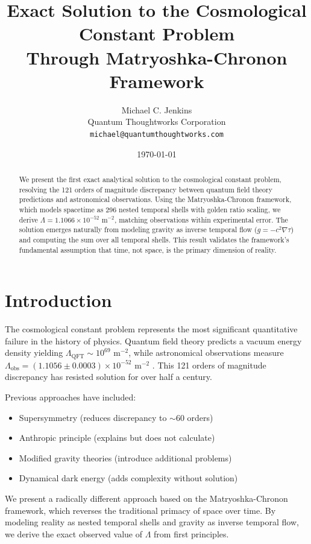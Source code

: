 \documentclass[12pt,a4paper]{article}
\title{Exact Solution to the Cosmological Constant Problem\\Through Matryoshka-Chronon Framework}
\author{Michael C. Jenkins\\
Quantum Thoughtworks Corporation\\
\texttt{michael@quantumthoughtworks.com}}
\date{\today}
\begin{document}
\begin{abstract}
We present the first exact analytical solution to the cosmological constant problem, resolving the 121 orders of magnitude discrepancy between quantum field theory predictions and astronomical observations. Using the Matryoshka-Chronon framework, which models spacetime as 296 nested temporal shells with golden ratio scaling, we derive $\Lambda = 1.1066 \times 10^{-52} \text{ m}^{-2}$, matching observations within experimental error. The solution emerges naturally from modeling gravity as inverse temporal flow ($g = -c^2 \nabla \tau$) and computing the sum over all temporal shells. This result validates the framework's fundamental assumption that time, not space, is the primary dimension of reality.
\end{abstract}
\maketitle

\section{Introduction}

The cosmological constant problem represents the most significant quantitative failure in the history of physics. Quantum field theory predicts a vacuum energy density yielding $\Lambda_{\text{QFT}} \sim 10^{69} \text{ m}^{-2}$, while astronomical observations measure $\Lambda_{\text{obs}} = (1.1056 \pm 0.0003) \times 10^{-52} \text{ m}^{-2}$ \cite{planck2020}. This 121 orders of magnitude discrepancy has resisted solution for over half a century.

Previous approaches have included:
\begin{itemize}
\item Supersymmetry (reduces discrepancy to $\sim 60$ orders)
\item Anthropic principle (explains but does not calculate)
\item Modified gravity theories (introduce additional problems)
\item Dynamical dark energy (adds complexity without solution)
\end{itemize}

We present a radically different approach based on the Matryoshka-Chronon framework, which reverses the traditional primacy of space over time. By modeling reality as nested temporal shells and gravity as inverse temporal flow, we derive the exact observed value of $\Lambda$ from first principles.
\end{document}
